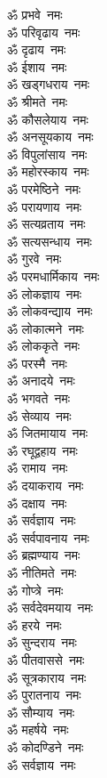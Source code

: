 \begin{multicols}{2}
\begin{flushleft}
ॐ प्रभवे~नमः\hfill{}\\
ॐ परिवृढाय~नमः\\
ॐ दृढाय~नमः\\
ॐ ईशाय~नमः\\
ॐ खड्गधराय~नमः\\
ॐ श्रीमते~नमः\\
ॐ कौसलेयाय~नमः\\
ॐ अनसूयकाय~नमः\\
ॐ विपुलांसाय~नमः\\
ॐ महोरस्काय~नमः\\
ॐ परमेष्ठिने~नमः\hfill{}\\
ॐ परायणाय~नमः\\
ॐ सत्यव्रताय~नमः\\
ॐ सत्यसन्धाय~नमः\\
ॐ गुरवे~नमः\\
ॐ परमधार्मिकाय~नमः\\
ॐ लोकज्ञाय~नमः\\
ॐ लोकवन्द्याय~नमः\\
ॐ लोकात्मने~नमः\\
ॐ लोककृते~नमः\\
ॐ परस्मै~नमः\hfill{}\\
ॐ अनादये~नमः\\
ॐ भगवते~नमः\\
ॐ सेव्याय~नमः\\
ॐ जितमायाय~नमः\\
ॐ रघूद्वहाय~नमः\\
ॐ रामाय~नमः\\
ॐ दयाकराय~नमः\\
ॐ दक्षाय~नमः\\
ॐ सर्वज्ञाय~नमः\\
ॐ सर्वपावनाय~नमः\hfill{}\\
ॐ ब्रह्मण्याय~नमः\\
ॐ नीतिमते~नमः\\
ॐ गोप्त्रे~नमः\\
ॐ सर्वदेवमयाय~नमः\\
ॐ हरये~नमः\\
ॐ सुन्दराय~नमः\\
ॐ पीतवाससे~नमः\\
ॐ सूत्रकाराय~नमः\\
ॐ पुरातनाय~नमः\\
ॐ सौम्याय~नमः\hfill{}\\
ॐ महर्षये~नमः\\
ॐ कोदण्डिने~नमः\\
ॐ सर्वज्ञाय~नमः\\

\end{flushleft}
\end{multicols}
